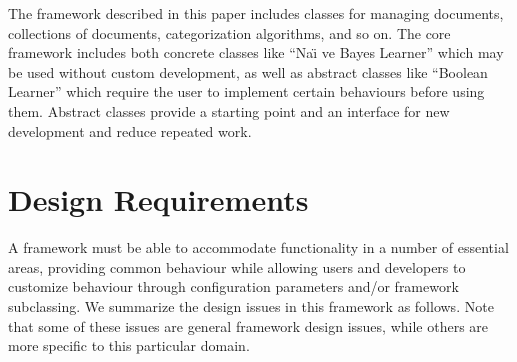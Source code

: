 \documentclass[twocolumn]{article}
\begin{document}
The framework described in this paper includes classes for managing
documents, collections of documents, categorization algorithms, and so
on.  The core framework includes both concrete classes like ``Na\"\i
ve Bayes Learner'' which may be used without custom development, as
well as abstract classes like ``Boolean Learner'' which require the
user to implement certain behaviours before using them.  Abstract
classes provide a starting point and an interface for new development
and reduce repeated work.


\section{Design Requirements}

A framework must be able to accommodate functionality in a number of essential areas, providing common behaviour while allowing users and developers to customize behaviour through configuration parameters and/or framework subclassing.  We summarize the design issues in this framework as follows.  Note that some of these issues are general framework design issues, while others are more specific to this particular domain.
\end{document}

